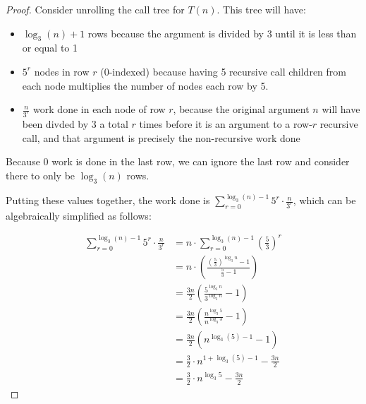 \documentclass[10pt]{article}
\begin{document}
\begin{enumerate}[label={}]
            \begin{proof}
                  Consider unrolling the call tree for $T(n)$. This tree will have:
                  \begin{itemize}
                        \item $\log _3(n)+1$ rows because the argument is divided by 3 until it is less than or equal to 1
                        \item $5^r$ nodes in row $r$ (0-indexed) because having 5 recursive call children from each node multiplies the number of nodes each row by 5.
                        \item $\frac{n}{3^r}$ work done in each node of row $r$, because the original argument $n$ will have been divded by 3 a total $r$ times before it is an argument to a row-$r$ recursive call, and that argument is precisely the non-recursive work done
                  \end{itemize}
                  Because 0 work is done in the last row, we can ignore the last row and consider there to only be $\log _3(n)$ rows.

                  Putting these values together, the work done is $\sum_{r=0}^{\log _3(n)-1} 5^r \cdot \frac{n}{3^r}$, which can be algebraically simplified as follows:

                  $$
                        \begin{aligned}
                              \sum_{r=0}^{\log _3(n)-1} 5^r \cdot \frac{n}{3^r} & =n \cdot \sum_{r=0}^{\log _3(n)-1}\left(\frac{5}{3}\right)^r                      \\
                                                                                & =n \cdot\left(\frac{\left(\frac{5}{3}\right)^{\log _3 n}-1}{\frac{5}{3}-1}\right) \\
                                                                                & =\frac{3 n}{2}\left(\frac{5^{\log _3 n}}{3^{\log _3 n}}-1\right)                  \\
                                                                                & =\frac{3 n}{2}\left(\frac{n^{\log _3 5}}{n^{\log _3 3}}-1\right)                  \\
                                                                                & =\frac{3 n}{2}\left(n^{\log _3(5)-1}-1\right)                                     \\
                                                                                & =\frac{3}{2} \cdot n^{1+\log _3(5)-1}-\frac{3 n}{2}                               \\
                                                                                & =\frac{3}{2} \cdot n^{\log _3 5}-\frac{3 n}{2}
                        \end{aligned}
                  $$



\end{proof}
\end{enumerate}
\end{document}
